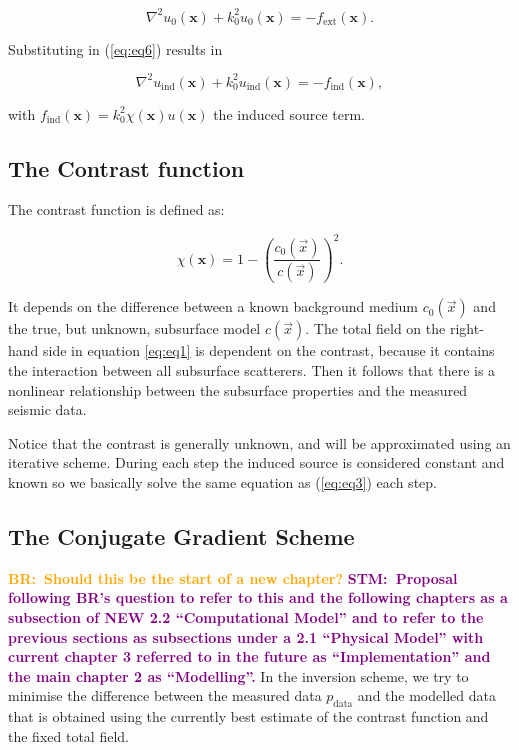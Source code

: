 \documentclass[10pt,a4paper]{article}
\newcommand{\commentstmtwo}[1]{\textcolor{purple}{\textbf{STM:\ #1}}}
\newcommand{\commentbr}[1]{\textcolor{orange}{\textbf{BR:\ #1}}}
\begin{document}
\begin{equation} \label{eq:eq6}
\nabla^2 u_0(\mathbf{x}) + k_0^2 u_0(\mathbf{x}) = -f_{\text{ext}}(\mathbf{x}).
\end{equation}

Substituting in (\ref{eq:eq6}) results in

\begin{equation} \label{eq:eq7}
\nabla^2 u_\text{ind}(\mathbf{x}) + k_0^2 u_\text{ind}(\mathbf{x}) = -f_\text{ind}(\mathbf{x}),
\end{equation}

with $f_\text{ind}(\mathbf{x}) = k_0^2 \chi(\mathbf{x}) u(\mathbf{x})$ the induced source term.


\subsection{The Contrast function}

The contrast function is defined as:

\begin{equation} \label{eq:eq8}\chi(\mathbf{x}) = 1 - \left(\frac{c_0(\vec{x})}{c(\vec{x})} \right)^2. \end{equation}

It depends on the difference between a known background medium $c_\text{0}(\vec{x})$ and the true, but unknown, subsurface model $c(\vec{x})$. The total field on the right-hand side in equation \ref{eq:eq1} is dependent on the contrast, because it contains the interaction between all subsurface scatterers. Then it follows that there is a nonlinear relationship between the subsurface properties and the measured seismic data.

Notice that the contrast is generally unknown, and will be approximated using an iterative scheme. During each step the induced source is considered constant and known so we basically solve the same equation as (\ref{eq:eq3}) each step.

\subsection{The Conjugate Gradient Scheme}
\commentbr{Should this be the start of a new chapter?}
\commentstmtwo{Proposal following BR's question to refer to this and the following chapters as a subsection of  NEW 2.2 ``Computational Model'' and to refer to the previous sections as subsections under a 2.1 ``Physical Model'' with current chapter 3 referred to in the future as ``Implementation'' and the main chapter 2 as ``Modelling''.}
In the inversion scheme, we try to minimise the difference between the measured data $p_\text{data}$ and the modelled data that is obtained using the currently best estimate of the contrast function and the fixed total field.
\end{document}

